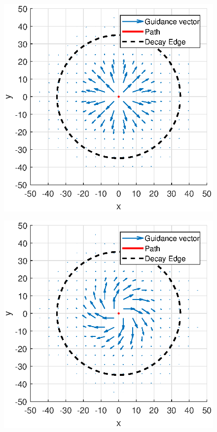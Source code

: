 \documentclass[conf]{new-aiaa}
\begin{document}
\begin{figure}[H]
	\centering
	\includegraphics[width=0.7\linewidth]{Figures/methods/decayApplied}
	\caption{}
	\label{fig:decayapplied}
\end{figure}

\begin{figure}
	\centering
	\includegraphics[width=0.7\linewidth]{Figures/methods/decayAppliedCirculation}
	\caption{}
	\label{fig:decayappliedcirculation}
\end{figure}
\end{document}
